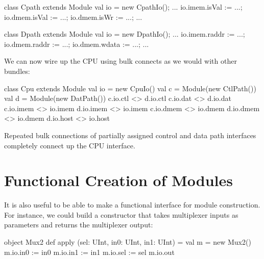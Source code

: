 \documentclass[twocolumn,10pt]{article}
\begin{document}
\begin{scala}
class Cpath extends Module {
  val io = new CpathIo();
  ...
  io.imem.isVal := ...;
  io.dmem.isVal := ...;
  io.dmem.isWr  := ...;
  ...
}

class Dpath extends Module {
  val io = new DpathIo();
  ...
  io.imem.raddr := ...;
  io.dmem.raddr := ...;
  io.dmem.wdata := ...;
  ...
}
\end{scala}

\noindent
We can now wire up the CPU using bulk connects as we would with other bundles:

\begin{scala}
class Cpu extends Module {
  val io = new CpuIo()
  val c  = Module(new CtlPath())
  val d  = Module(new DatPath())
  c.io.ctl  <> d.io.ctl
  c.io.dat  <> d.io.dat
  c.io.imem <> io.imem
  d.io.imem <> io.imem
  c.io.dmem <> io.dmem
  d.io.dmem <> io.dmem
  d.io.host <> io.host
}
\end{scala}

\noindent
Repeated bulk connections of partially assigned control and data path interfaces
completely connect up the CPU interface.

%
%
%
%
%

\section{Functional Creation of Modules}
\label{sec:funconstructor}

It is also useful to be able to make a functional interface for
module construction.  For instance, we could build a constructor
that takes multiplexer inputs as parameters and returns the
multiplexer output:

\begin{scala}
object Mux2 {
  def apply (sel: UInt, in0: UInt, in1: UInt) = {
    val m = new Mux2()
    m.io.in0 := in0
    m.io.in1 := in1
    m.io.sel := sel
    m.io.out
  }
}
\end{scala}
\end{document}
